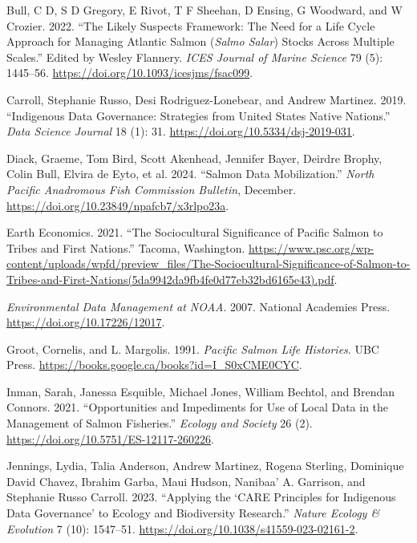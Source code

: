 \documentclass[
  letterpaper,
  DIV=11,
  numbers=noendperiod]{scrartcl}
\newlength{\cslhangindent}
\newenvironment{CSLReferences}[2] %
 {\begin{list}{}{%
  \setlength{\itemindent}{0pt}
  \setlength{\leftmargin}{0pt}
  \setlength{\parsep}{0pt}
  \ifodd #1
   \setlength{\leftmargin}{\cslhangindent}
   \setlength{\itemindent}{-1\cslhangindent}
  \fi
  \setlength{\itemsep}{#2\baselineskip}}}
 {\end{list}}
\begin{document}
\label{refs}
\begin{CSLReferences}{1}{0}
Bull, C D, S D Gregory, E Rivot, T F Sheehan, D Ensing, G Woodward, and
W Crozier. 2022. {``The Likely Suspects Framework: The Need for a Life
Cycle Approach for Managing Atlantic Salmon ({\emph{Salmo Salar}})
Stocks Across Multiple Scales.''} Edited by Wesley Flannery. \emph{ICES
Journal of Marine Science} 79 (5): 1445--56.
\url{https://doi.org/10.1093/icesjms/fsac099}.

Carroll, Stephanie Russo, Desi Rodriguez-Lonebear, and Andrew Martinez.
2019. {``Indigenous Data Governance: Strategies from United States
Native Nations.''} \emph{Data Science Journal} 18 (1): 31.
\url{https://doi.org/10.5334/dsj-2019-031}.

Diack, Graeme, Tom Bird, Scott Akenhead, Jennifer Bayer, Deirdre Brophy,
Colin Bull, Elvira de Eyto, et al. 2024. {``Salmon Data Mobilization.''}
\emph{North Pacific Anadromous Fish Commission Bulletin}, December.
\url{https://doi.org/10.23849/npafcb7/x3rlpo23a}.

Earth Economics. 2021. {``The Sociocultural Significance of Pacific
Salmon to Tribes and First Nations.''} Tacoma, Washington.
\url{https://www.psc.org/wp-content/uploads/wpfd/preview_files/The-Sociocultural-Significance-of-Salmon-to-Tribes-and-First-Nations(5da9942da9fb4fe0d77eb32bd6165e43).pdf}.

\emph{Environmental Data Management at NOAA}. 2007. National Academies
Press. \url{https://doi.org/10.17226/12017}.

Groot, Cornelis, and L. Margolis. 1991. \emph{Pacific Salmon Life
Histories}. UBC Press.
\url{https://books.google.ca/books?id=I_S0xCME0CYC}.

Inman, Sarah, Janessa Esquible, Michael Jones, William Bechtol, and
Brendan Connors. 2021. {``Opportunities and Impediments for Use of Local
Data in the Management of Salmon Fisheries.''} \emph{Ecology and
Society} 26 (2). \url{https://doi.org/10.5751/ES-12117-260226}.

Jennings, Lydia, Talia Anderson, Andrew Martinez, Rogena Sterling,
Dominique David Chavez, Ibrahim Garba, Maui Hudson, Nanibaa' A.
Garrison, and Stephanie Russo Carroll. 2023. {``Applying the {`}CARE
Principles for Indigenous Data Governance{'} to Ecology and Biodiversity
Research.''} \emph{Nature Ecology \& Evolution} 7 (10): 1547--51.
\url{https://doi.org/10.1038/s41559-023-02161-2}.


\end{CSLReferences}
\end{document}
